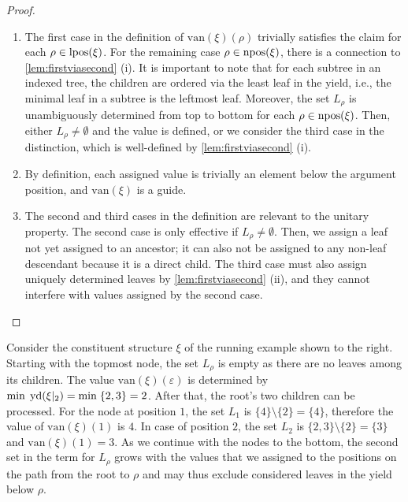 \documentclass[../../document.tex]{subfiles}
\begin{document}
    \begin{proof}
        \begin{enumerate}
            \item
                The first case in the definition of \(\mathrm{van}(\xi)(\rho)\) trivially satisfies the claim for each \(\rho \in \operatorname{lpos}(\xi)\).
                For the remaining case \(\rho \in \operatorname{npos}(\xi)\), there is a connection to \cref{lem:firstviasecond} (i).
                It is important to note that for each subtree in an indexed tree, the children are ordered via the least leaf in the yield, i.e., the minimal leaf in a subtree is the leftmost leaf.
                Moreover, the set \(L_\rho\) is unambiguously determined from top to bottom for each \(\rho \in \operatorname{npos}(\xi)\).
                Then, either \(L_\rho \neq \emptyset\) and the value is defined, or we consider the third case in the distinction, which is well-defined by \cref{lem:firstviasecond} (i).
            \item
                By definition, each assigned value is trivially an element below the argument position, and \(\mathrm{van}(\xi)\) is a guide.
            \item
                The second and third cases in the definition are relevant to the unitary property.
                The second case is only effective if \(L_\rho \neq \emptyset\).
                Then, we assign a leaf not yet assigned to an ancestor; it can also not be assigned to any non-leaf descendant because it is a direct child.
                The third case must also assign uniquely determined leaves by \cref{lem:firstviasecond} (ii), and they cannot interfere with values assigned by the second case.
        \end{enumerate}
    \end{proof}

    \begin{wrapfigure}[6]{r}{.3\linewidth}
        \centering
        
    \end{wrapfigure}
    Consider the constituent structure \(\xi\) of the running example shown to the right.
    Starting with the topmost node, the set \(L_\rho\) is empty as there are no leaves among its children.
    The value \(\mathrm{van}(\xi)(\varepsilon)\) is determined by \(\min\;\operatorname{yd}(\xi|_{2}) = \min\;\{2,3\} = 2\).
    After that, the root's two children can be processed.
    For the node at position \(1\), the set \(L_{1}\) is \(\{4\} \setminus \{2\} = \{4\}\), therefore the value of \(\mathrm{van}(\xi)(1)\) is \(4\).
    In case of position \(2\), the set \(L_{2}\) is \(\{2,3\} \setminus \{2\} = \{3\}\) and \(\mathrm{van}(\xi)(1)=3\).
    As we continue with the nodes to the bottom, the second set in the term for \(L_\rho\) grows with the values that we assigned to the positions on the path from the root to \(\rho\) and may thus exclude considered leaves in the yield below \(\rho\).
    \exampleqed
\end{document}
